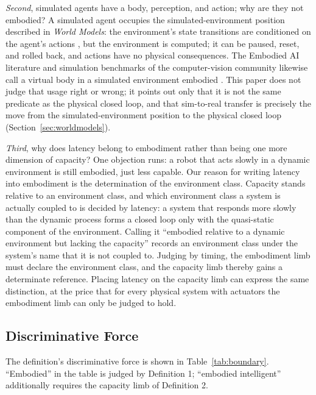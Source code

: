 \documentclass[10pt]{article}
\begin{document}
\textit{Second}, simulated agents have a body, perception, and action; why are they not embodied? A simulated agent occupies the simulated-environment position described in \textit{World Models}: the environment's state transitions are conditioned on the agent's actions \cite{yu2026wm}, but the environment is computed; it can be paused, reset, and rolled back, and actions have no physical consequences. The Embodied AI literature and simulation benchmarks of the computer-vision community likewise call a virtual body in a simulated environment embodied \cite{savva2019,yang2025embodiedbench,hellstrom2024}. This paper does not judge that usage right or wrong; it points out only that it is not the same predicate as the physical closed loop, and that sim-to-real transfer is precisely the move from the simulated-environment position to the physical closed loop (Section~\ref{sec:worldmodels}).

\textit{Third}, why does latency belong to embodiment rather than being one more dimension of capacity? One objection runs: a robot that acts slowly in a dynamic environment is still embodied, just less capable. Our reason for writing latency into embodiment is the determination of the environment class. Capacity stands relative to an environment class, and which environment class a system is actually coupled to is decided by latency: a system that responds more slowly than the dynamic process forms a closed loop only with the quasi-static component of the environment. Calling it ``embodied relative to a dynamic environment but lacking the capacity'' records an environment class under the system's name that it is not coupled to. Judging by timing, the embodiment limb must declare the environment class, and the capacity limb thereby gains a determinate reference. Placing latency on the capacity limb can express the same distinction, at the price that for every physical system with actuators the embodiment limb can only be judged to hold.

\subsection{Discriminative Force}\label{sec:discrim}

The definition's discriminative force is shown in Table~\ref{tab:boundary}. ``Embodied'' in the table is judged by Definition 1; ``embodied intelligent'' additionally requires the capacity limb of Definition 2.
\end{document}
